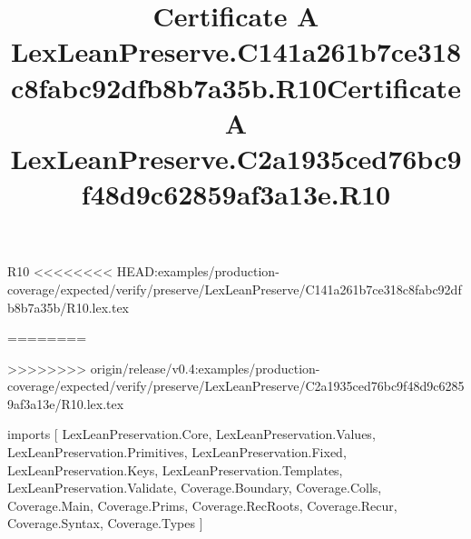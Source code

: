 \begin{lexlean}{R10}
<<<<<<<< HEAD:examples/production-coverage/expected/verify/preserve/LexLeanPreserve/C141a261b7ce318c8fabc92dfb8b7a35b/R10.lex.tex
\title{Certificate A LexLeanPreserve.C141a261b7ce318c8fabc92dfb8b7a35b.R10}
========
\title{Certificate A LexLeanPreserve.C2a1935ced76bc9f48d9c62859af3a13e.R10}
>>>>>>>> origin/release/v0.4:examples/production-coverage/expected/verify/preserve/LexLeanPreserve/C2a1935ced76bc9f48d9c62859af3a13e/R10.lex.tex
\begin{coremodule}
imports [
  LexLeanPreservation.Core,
  LexLeanPreservation.Values,
  LexLeanPreservation.Primitives,
  LexLeanPreservation.Fixed,
  LexLeanPreservation.Keys,
  LexLeanPreservation.Templates,
  LexLeanPreservation.Validate,
  Coverage.Boundary,
  Coverage.Colls,
  Coverage.Main,
  Coverage.Prims,
  Coverage.RecRoots,
  Coverage.Recur,
  Coverage.Syntax,
  Coverage.Types
]


\end{coremodule}
\end{lexlean}
